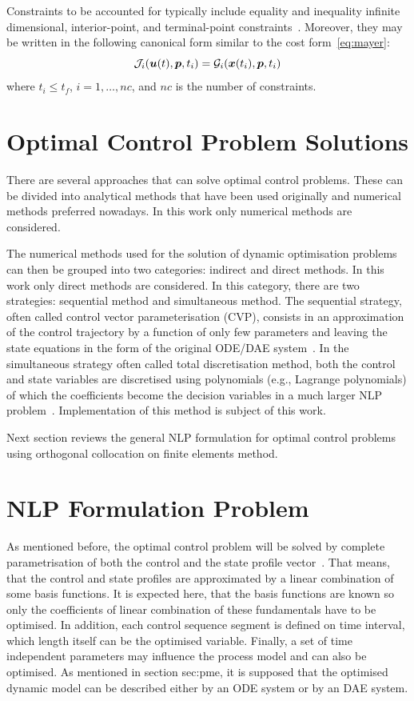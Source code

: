 Constraints to be accounted for typically include
equality and inequality infinite dimensional, interior-point, and
terminal-point constraints~\cite{goh88}. Moreover, they may be written
in the following canonical form similar to the cost
form~\eqref{eq:mayer}: 
\begin{equation}
\mf{J}_{i}(\ve{u}(t),\ve{p},t_i) = \mf{G}_{i}(\ve{x}(t_{i}),\ve{p},t_i) 
\label{eq:constraints} 
\end{equation} where $t_i \leq t_f$, $i=1,\ldots,nc$, and $nc$ is
the number of constraints.

\section{Optimal Control Problem Solutions}
\label{sec:ocps}

There are several approaches that can solve optimal control problems.
These can be divided into analytical methods that have been used
originally and numerical methods preferred nowadays. In this work only
numerical methods are considered.

The numerical methods used for the solution of dynamic optimisation
problems can then be grouped into two categories: indirect and direct
methods. In this work only direct methods are considered. In this
category, there are two strategies: sequential method and simultaneous
method. The sequential strategy, often called control vector
parameterisation (CVP), consists in an approximation of the control
trajectory by a function of only few parameters and leaving the state
equations in the form of the original ODE/DAE system~\cite{goh88}. In
the simultaneous strategy often called total discretisation method,
both the control and state variables are discretised using polynomials
(e.g., Lagrange polynomials) of which the coefficients become the
decision variables in a much larger NLP problem~\cite{cut87}.
Implementation of this method is subject of this work.

Next section reviews the general NLP formulation for optimal control
problems using orthogonal collocation on finite elements method.

\section{NLP Formulation Problem}
\label{sec:nlp-fp}

As mentioned before, the optimal control problem will be solved by
complete parametrisation of both the control and the state profile
vector~\citep{log89,log92}. That means, that the control and state
profiles are approximated by a linear combination of some basis
functions. It is expected here, that the basis functions are known so
only the coefficients of linear combination of these fundamentals have
to be optimised. In addition, each control sequence segment is defined
on time interval, which length itself can be the optimised
variable. Finally, a set of time independent parameters may influence
the process model and can also be optimised. As mentioned
in section {sec:pme}, it is supposed that the optimised dynamic model can
be described either by an ODE system or by an DAE system.

